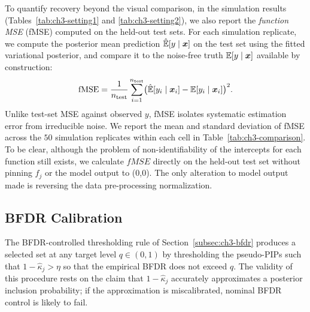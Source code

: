 {To quantify recovery beyond the visual comparison, 
in the simulation results (Tables~\ref{tab:ch3-setting1} and \ref{tab:ch3-setting2}),
we also report the \emph{function MSE} (fMSE) computed on the held-out test sets.  For each simulation
replicate, we compute the posterior mean prediction $\hat{\mathbb{E}}[y \mid \bm{x}]$ on the test set using the fitted
variational posterior, and compare it to the noise-free truth $\mathbb{E}[y \mid \bm{x}]$ available by construction:
\begin{equation}
  \mathrm{fMSE}
  = \frac{1}{n_{\mathrm{test}}} \sum_{i=1}^{n_{\mathrm{test}}}
    \bigl(\hat{\mathbb{E}}[y_i \mid \bm{x}_i]
          - \mathbb{E}[y_i \mid \bm{x}_i]\bigr)^2.
  \label{eq:ch3-fmse}
\end{equation}
Unlike test-set MSE against observed $y$, fMSE isolates systematic estimation error from irreducible noise.  
We report the mean and standard deviation of fMSE across the $50$ simulation replicates within each cell in Table~\ref{tab:ch3-comparison}.  To be clear, although the problem of non-identifiability of the intercepts for each function still exists, we calculate $fMSE$ directly on the held-out test set without pinning $f_j$ or the model output to (0,0).  The only alteration to model output made is reversing the data pre-processing normalization.  

\subsection{BFDR Calibration}
\label{subsec:ch3-bfdrcalib}

The BFDR-controlled thresholding rule of Section~\ref{subsec:ch3-bfdr}
produces a selected set at any target level $q \in (0, 1)$ by
thresholding the pseudo-PIPs such that $1 - \hat{\kappa}_j > \eta$ so that the
empirical BFDR does not exceed $q$.  The validity of this procedure
rests on the claim that $1 - \hat{\kappa}_j$ accurately approximates
a posterior inclusion probability; if the approximation is
miscalibrated, nominal BFDR control is likely to fail.



}
